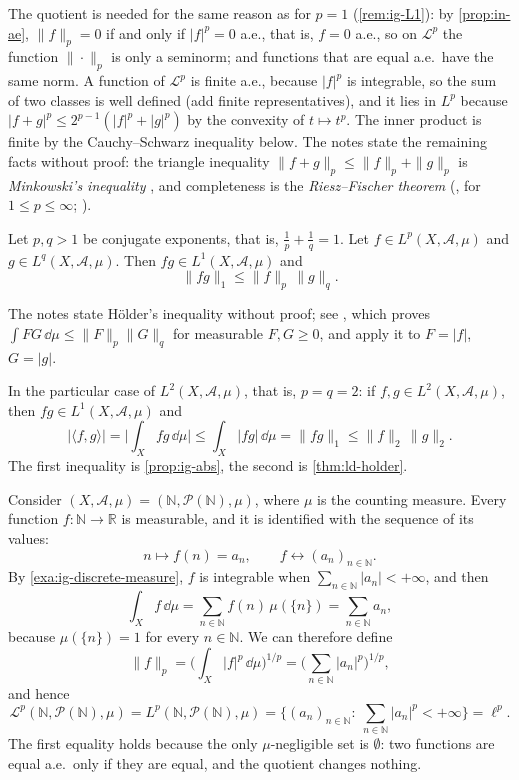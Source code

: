 The quotient is needed for the same reason as for $p=1$ (\cref{rem:ig-L1}): by
\cref{prop:in-ae}, $\|f\|_p=0$ if and only if $|f|^p=0$ a.e., that is, $f=0$ a.e., so on
$\mathcal L^p$ the function $\|\cdot\|_p$ is only a seminorm; and functions that are equal
a.e.\ have the same norm. A function of $\mathcal L^p$ is finite a.e., because $|f|^p$ is
integrable, so the sum of two classes is well defined (add finite representatives), and it lies
in $L^p$ because $|f+g|^p\le2^{p-1}(|f|^p+|g|^p)$ by the convexity of $t\mapsto t^p$. The inner
product is finite by the Cauchy--Schwarz inequality below. The notes state the remaining facts
without proof: the triangle inequality $\|f+g\|_p\le\|f\|_p+\|g\|_p$ is \emph{Minkowski's
inequality} \citep[Theorem~3.5]{rudin-rca}, and completeness is the \emph{Riesz--Fischer
theorem} (\citealp[Theorem~3.11]{rudin-rca}, for $1\le p\le\infty$; \citealp[Section~19]{billingsley}).

\begin{theorem}\label{thm:ld-holder}
Let $p,q>1$ be conjugate exponents, that is, $\frac1p+\frac1q=1$. Let
$f\in L^p(X,\mathcal A,\mu)$ and $g\in L^q(X,\mathcal A,\mu)$. Then $fg\in L^1(X,\mathcal A,\mu)$
and
\[
  \|fg\|_1\le\|f\|_p\,\|g\|_q .
\]
\end{theorem}

The notes state H\"older's inequality without proof; see \citet[Theorem~3.5]{rudin-rca}, which
proves $\int FG\,\dd\mu\le\|F\|_p\|G\|_q$ for measurable $F,G\ge0$, and apply it to $F=|f|$,
$G=|g|$.

\begin{remark}\label{cor:ld-cauchy-schwarz}
In the particular case of $L^2(X,\mathcal A,\mu)$, that is, $p=q=2$: if
$f,g\in L^2(X,\mathcal A,\mu)$, then $fg\in L^1(X,\mathcal A,\mu)$ and
\[
  |\langle f,g\rangle|=\Big|\int_Xfg\,\dd\mu\Big|\le\int_X|fg|\,\dd\mu=\|fg\|_1\le\|f\|_2\,\|g\|_2 .
\]
The first inequality is \cref{prop:ig-abs}, the second is \cref{thm:ld-holder}.
\end{remark}

\begin{example}\label{exa:ld-ellp}
Consider $(X,\mathcal A,\mu)=(\mathbb N,\mathcal P(\mathbb N),\mu)$, where $\mu$ is the
counting measure. Every function $f:\mathbb N\to\mathbb R$ is measurable, and it is identified
with the sequence of its values:
\[
  n\mapsto f(n)=a_n,\qquad f\longleftrightarrow(a_n)_{n\in\mathbb N}.
\]
By \cref{exa:ig-discrete-measure}, $f$ is integrable when $\sum_{n\in\mathbb N}|a_n|<+\infty$, and
then
\[
  \int_Xf\,\dd\mu=\sum_{n\in\mathbb N}f(n)\,\mu(\{n\})=\sum_{n\in\mathbb N}a_n,
\]
because $\mu(\{n\})=1$ for every $n\in\mathbb N$. We can therefore define
\[
  \|f\|_p=\Big(\int_X|f|^p\,\dd\mu\Big)^{1/p}=\Big(\sum_{n\in\mathbb N}|a_n|^p\Big)^{1/p},
\]
and hence
\[
  \mathcal L^p(\mathbb N,\mathcal P(\mathbb N),\mu)=L^p(\mathbb N,\mathcal P(\mathbb N),\mu)
  =\Big\{(a_n)_{n\in\mathbb N}:\ \sum_{n\in\mathbb N}|a_n|^p<+\infty\Big\}=\ell^p .
\]
The first equality holds because the only $\mu$-negligible set is $\emptyset$: two functions
are equal a.e.\ only if they are equal, and the quotient changes nothing.
\end{example}

